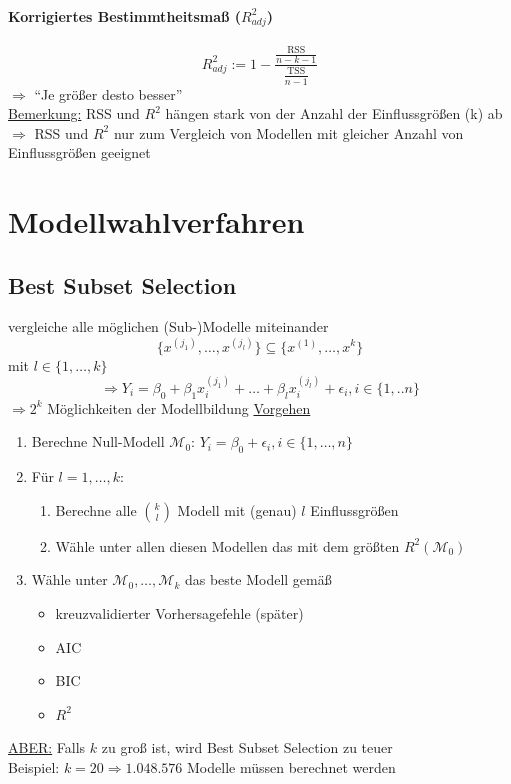 \documentclass[10pt]{report}
\theoremstyle{definition}
\begin{document}
\paragraph{Korrigiertes Bestimmtheitsmaß ($R^{2}_{adj}$)}
\[ R_{adj}^{2} := 1 - \frac{\frac{\text{RSS}}{n-k-1}}{\frac{\text{TSS}}{n-1}} \]
$\Rightarrow$ ``Je größer desto besser'' \\
\underline{Bemerkung:} RSS und $R^{2}$ hängen stark von der Anzahl der Einflussgrößen (k) ab\\
$\Rightarrow$ RSS und $R^{2}$ nur zum Vergleich von Modellen mit gleicher Anzahl von Einflussgrößen geeignet

\section{Modellwahlverfahren}
\subsection{Best Subset Selection}
vergleiche alle möglichen (Sub-)Modelle miteinander
\[ \{ x^{(j_1)},\dots, x^{(j_l)}\} \subseteq \{x^{(1)}, \dots, x^{k} \} \]
mit 
$l \in \{1, \dots, k \} $
\[ \Rightarrow Y_i = \beta_0 + \beta_1 x_i^{(j_1)} + \dots + \beta_l x_i^{(j_l)} + \epsilon_i , i \in \{1,..n\} \]
$\Rightarrow 2^{k} $ Möglichkeiten der Modellbildung
\underline{Vorgehen}
\begin{enumerate}
	\item Berechne Null-Modell $\mathcal{M}_0 $:
		$Y_i= \beta_0 + \epsilon_i , i \in \{1,\dots,n\} $
	\item Für $l=1,\dots,k$:
		\begin{enumerate}
			\item Berechne alle $\binom{k}{l}$ Modell mit (genau) $l$ Einflussgrößen
			\item Wähle unter allen diesen Modellen das mit dem größten $R^{2} (\mathcal{M}_0)$
		\end{enumerate}
	\item Wähle unter $\mathcal{M}_0,\dots,\mathcal{M}_k$ das beste Modell gemäß
		\begin{itemize}
			\item kreuzvalidierter Vorhersagefehle (später)
			\item AIC
			\item BIC
			\item $R^2$
		\end{itemize}
\end{enumerate}
\underline{ABER:} Falls $k$ zu groß ist, wird Best Subset Selection zu teuer \\
Beispiel: $k=20 \Rightarrow 1.048.576$ Modelle müssen berechnet werden
\end{document}
